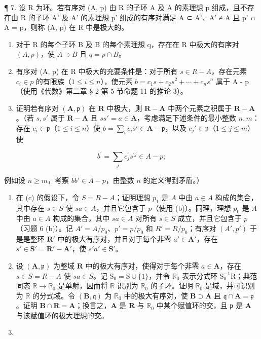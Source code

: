 ¶ 7. 设 R 为环。若有序对 (A, p) 由 R 的子环 A 及 A 的素理想 p 组成，且不存在由 R 的子环 A' 及 A' 的素理想 p' 组成的有序对满足 A ⊂ A'、A' ≠ A 且 p' ∩ A = p，则称 (A, p) 在 R 中是极大的。

\begin{enumerate}
\def\labelenumi{(\alph{enumi})}
\item
  对于 R 的每个子环 B 及 B 的每个素理想 q，存在在 R 中极大的有序对 \((A, p)\)，使 \(A \supset B\) 且 \(q = p \cap B\)。
\item
  有序对 (A, p) 在 R 中极大的充要条件是：对于所有 \(s \in R - A\)，存在元素 \(c_{i} \in p\) 的有限族（\(1 \leqslant i \leqslant n\)），使元素 \(b = c_{1}s + c_{2}s^{2} + \cdots + c_{n}s^{n}\) 属于 A - p（使用《代数》第二章 § 2 第 5 节命题 11 的推论 3）。
\item
  证明若有序对 \((\mathbf{A},\mathfrak{p})\) 在 \(\mathbf{R}\) 中极大，则 \(\mathbf{R} - \mathbf{A}\) 中两个元素之积属于 \(\mathbf{R} - \mathbf{A}\)。（若 \(s,s'\) 属于 \(\mathbf{R} - \mathbf{A}\) 且 \(ss' = a\in \mathbf{A}\)，考虑满足下述条件的最小整数 \(n,m\)：存在 \(c_{i}\in \mathfrak{p}\)（\(1\leqslant i\leqslant n\)）使 \(b = \sum_{i}c_{i}s^{i}\in \mathbf{A} - \mathfrak{p}\)，以及 \(c_{j}'\in \mathfrak{p}\)（\(1\leqslant j\leqslant m\)）使
\end{enumerate}

\[
b ^ {\prime} = \sum_ {j} c _ {j} ^ {\prime} s ^ {\prime j} \in A - p;
\]

  例如设 \(n \geqslant m\)，考察 \(bb' \in A - p\)，由整数 \(n\) 的定义得到矛盾。）

\begin{enumerate}
\def\labelenumi{(\alph{enumi})}
\setcounter{enumi}{3}
\item
  在 (c) 的假设下，令 \(S = R - A\)；证明理想 \(p_1\) 是 \(A\) 中由 \(a \in A\) 构成的集合，其中存在 \(s \in S\) 使 \(sa \in A\)，并且它包含于 \(p\)（使用 (b)）。同理，理想 \(p_0\) 是 \(A\) 中由 \(a \in A\) 构成的集合，其中 \(sa \in A\) 对所有 \(s \in S\) 成立，并且它包含于 \(p\)（习题 6 (b)）。记 \(A' = A / p_0\)、\(p' = p / p_0\) 和 \(R' = R / p_0\)；有序对 \((A', p')\) 于是是整环 \(\mathbf{R}'\) 中的极大有序对，并且对于每个非零 \(a' \in \mathbf{A}'\)，存在 \(s' \in \mathbf{S}' = \mathbf{R}' - \mathbf{A}'\)，使 \(s'a' \in \mathbf{S}'\)。
\item
  设 \((\mathbf{A},\mathfrak{p})\) 为整域 \(\mathbf{R}\) 中的极大有序对，使得对于每个非零 \(a\in \mathbf{A}\)，存在 \(s\in S = R - A\) 使 \(sa\in S\)。记 \(\mathrm{S}_0 = \mathrm{S}\cup \{1\}\)，并令 \(\mathbb{R}_0\) 表示分式环 \(\mathrm{S}_0^{-1}\mathrm{R}\)；典范同态 \(\mathbb{R}\to \mathbb{R}_0\) 是单射，因而将 \(\mathbb{R}\) 识别为 \(\mathbb{R}_0\) 的子环。证明 \(\mathbb{R}_0\) 是域，并可识别为 \(\mathbb{R}\) 的分式域。令 \((\mathbf{B},\mathfrak{q})\) 为 \(\mathbb{R}_0\) 中的极大有序对，使 \(\mathbf{B}\supset \mathbf{A}\) 且 \(\mathfrak{q}\cap \mathbf{A} = \mathfrak{p}\)。证明 \(\mathbf{B}\cap \mathbf{R} = \mathbf{A}\)；换言之，\(\mathbf{A}\) 是 \(\mathbf{R}\) 与 \(\mathbb{R}_0\) 中某个赋值环的交，且 \(\mathfrak{p}\) 是 \(\mathbf{A}\) 与该赋值环的极大理想的交。
\item
\end{enumerate}


